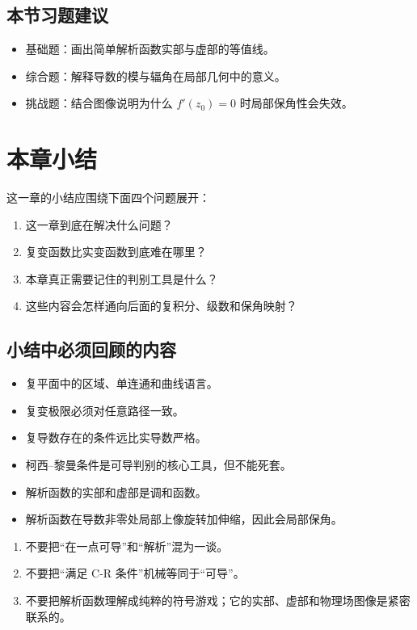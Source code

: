 \subsection*{本节习题建议}
\begin{itemize}
    \item 基础题：画出简单解析函数实部与虚部的等值线。
    \item 综合题：解释导数的模与辐角在局部几何中的意义。
    \item 挑战题：结合图像说明为什么 $f'(z_0)=0$ 时局部保角性会失效。
\end{itemize}

\section{本章小结}

\begin{tishi}[本章小结建议写法]
这一章的小结应围绕下面四个问题展开：
\begin{enumerate}
    \item 这一章到底在解决什么问题？
    \item 复变函数比实变函数到底难在哪里？
    \item 本章真正需要记住的判别工具是什么？
    \item 这些内容会怎样通向后面的复积分、级数和保角映射？
\end{enumerate}
\end{tishi}

\subsection*{小结中必须回顾的内容}
\begin{itemize}
    \item 复平面中的区域、单连通和曲线语言。
    \item 复变极限必须对任意路径一致。
    \item 复导数存在的条件远比实导数严格。
    \item 柯西--黎曼条件是可导判别的核心工具，但不能死套。
    \item 解析函数的实部和虚部是调和函数。
    \item 解析函数在导数非零处局部上像旋转加伸缩，因此会局部保角。
\end{itemize}

\begin{jinshi}[小结里要特别提醒学生的误区]
\begin{enumerate}
    \item 不要把``在一点可导''和``解析''混为一谈。
    \item 不要把``满足 C-R 条件''机械等同于``可导''。
    \item 不要把解析函数理解成纯粹的符号游戏；它的实部、虚部和物理场图像是紧密联系的。
\end{enumerate}
\end{jinshi}

